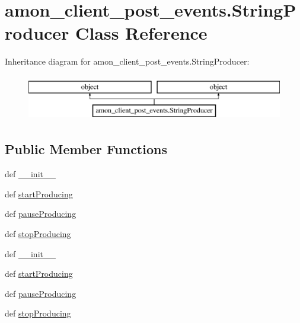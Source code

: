 \hypertarget{classamon__client__post__events_1_1_string_producer}{\section{amon\-\_\-client\-\_\-post\-\_\-events.\-String\-Producer Class Reference}
\label{classamon__client__post__events_1_1_string_producer}
}
Inheritance diagram for amon\-\_\-client\-\_\-post\-\_\-events.\-String\-Producer\-:\begin{figure}[H]
\begin{center}
\leavevmode
\includegraphics[height=2.000000cm]{classamon__client__post__events_1_1_string_producer}
\end{center}
\end{figure}
\subsection*{Public Member Functions}
\begin{DoxyCompactItemize}
\item 
def \hyperlink{classamon__client__post__events_1_1_string_producer_ac2908908965317f0faa0c7f362c1a209}{\-\_\-\-\_\-init\-\_\-\-\_\-}
\item 
def \hyperlink{classamon__client__post__events_1_1_string_producer_a48cf3f30df73ed98063f87edd0b65d31}{start\-Producing}
\item 
def \hyperlink{classamon__client__post__events_1_1_string_producer_aea46523df84eb5fdf9e002056bde4148}{pause\-Producing}
\item 
def \hyperlink{classamon__client__post__events_1_1_string_producer_ac21b83f98560eb605b6afa71d5ffb438}{stop\-Producing}
\item 
def \hyperlink{classamon__client__post__events_1_1_string_producer_ac2908908965317f0faa0c7f362c1a209}{\-\_\-\-\_\-init\-\_\-\-\_\-}
\item 
def \hyperlink{classamon__client__post__events_1_1_string_producer_a48cf3f30df73ed98063f87edd0b65d31}{start\-Producing}
\item 
def \hyperlink{classamon__client__post__events_1_1_string_producer_aea46523df84eb5fdf9e002056bde4148}{pause\-Producing}
\item 
def \hyperlink{classamon__client__post__events_1_1_string_producer_ac21b83f98560eb605b6afa71d5ffb438}{stop\-Producing}
\end{DoxyCompactItemize}
